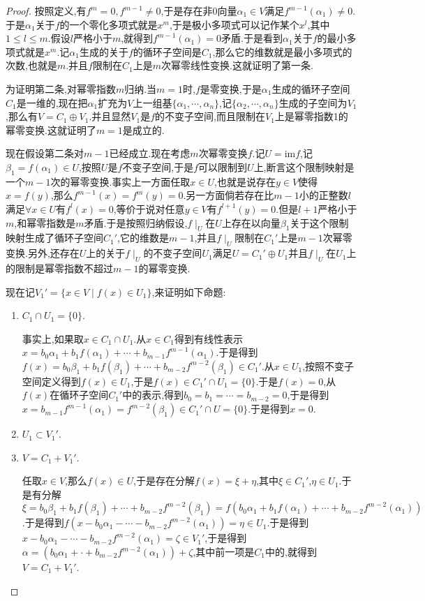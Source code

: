 \begin{proof}
	
	按照定义,有$f^m=0,f^{m-1}\not=0$,于是存在非0向量$\alpha_1\in V$满足$f^{m-1}(\alpha_1)\not=0$.于是$\alpha_1$关于$f$的一个零化多项式就是$x^m$,于是极小多项式可以记作某个$x^l$,其中$1\le l\le m$.假设$l$严格小于$m$,就得到$f^{m-1}(\alpha_1)=0$矛盾.于是看到$\alpha_1$关于$f$的最小多项式就是$x^m$.记$\alpha_1$生成的关于$f$的循环子空间是$C_1$,那么它的维数就是最小多项式的次数,也就是$m$.并且$f$限制在$C_1$上是$m$次幂零线性变换.这就证明了第一条.
	
	为证明第二条,对幂零指数$m$归纳.当$m=1$时,$f$是零变换,于是$\alpha_1$生成的循环子空间$C_1$是一维的,现在把$\alpha_1$扩充为$V$上一组基$\{\alpha_1,\cdots,\alpha_n\}$,记$\{\alpha_2,\cdots,\alpha_n\}$生成的子空间为$V_1$,那么有$V=C_1\oplus V_1$.并且显然$V_1$是$f$的不变子空间,而且限制在$V_1$上是幂零指数1的幂零变换.这就证明了$m=1$是成立的.
	
	现在假设第二条对$m-1$已经成立.现在考虑$m$次幂零变换$f$.记$U=\mathrm{im}f$,记$\beta_1=f(\alpha_1)\in U$,按照$U$是$f$不变子空间,于是$f$可以限制到$U$上,断言这个限制映射是一个$m-1$次的幂零变换.事实上一方面任取$x\in U$,也就是说存在$y\in V$使得$x=f(y)$,那么$f^{m-1}(x)=f^m(y)=0$.另一方面倘若存在比$m-1$小的正整数$l$满足$\forall x\in U$有$f^l(x)=0$,等价于说对任意$y\in V$有$f^{l+1}(y)=0$.但是$l+1$严格小于$m$,和幂零指数是$m$矛盾.于是按照归纳假设,$f\mid_U$在$U$上存在以向量$\beta_1$关于这个限制映射生成了循环子空间$C_1'$,它的维数是$m-1$,并且$f\mid_U$限制在$C_1'$上是$m-1$次幂零变换.另外,还存在$U$上的关于$f\mid_U$的不变子空间$U_1$满足$U=C_1'\oplus U_1$并且$f\mid_U$在$U_1$上的限制是幂零指数不超过$m-1$的幂零变换.
	
	现在记$V_1'=\{x\in V\mid f(x)\in U_1\}$,来证明如下命题:
	\begin{enumerate}
		\item $C_1\cap U_1=\{0\}$.
		
		事实上,如果取$x\in C_1\cap U_1$.从$x\in C_1$得到有线性表示$x=b_0\alpha_1+b_1f(\alpha_1)+\cdots+b_{m-1}f^{m-1}(\alpha_1)$.于是得到$f(x)=b_0\beta_1+b_1f(\beta_1)+\cdots+b_{m-2}f^{m-2}(\beta_1)\in C_1'$.从$x\in U_1$,按照不变子空间定义得到$f(x)\in U_1$,于是$f(x)\in C_1'\cap U_1=\{0\}$.于是$f(x)=0$,从$f(x)$在循环子空间$C_1'$中的表示,得到$b_0=b_1=\cdots=b_{m-2}=0$,于是得到$x=b_{m-1}f^{m-1}(\alpha_1)=f^{m-2}(\beta_1)\in C_1'\cap U=\{0\}$.于是得到$x=0$.
		
		\item $U_1\subset V_1'$.
		\item $V=C_1+V_1'$.
		
		任取$x\in V$,那么$f(x)\in U$,于是存在分解$f(x)=\xi+\eta$,其中$\xi\in C_1'$,$\eta\in U_1$.于是有分解$\xi=b_0\beta_1+b_1f(\beta_1)+\cdots+b_{m-2}f^{m-2}(\beta_1)=f(b_0\alpha_1+b_1f(\alpha_1)+\cdots+b_{m-2}f^{m-2}(\alpha_1))$.于是得到$f(x-b_0\alpha_1-\cdots-b_{m-2}f^{m-2}(\alpha_1))=\eta\in U_1$.于是得到$x-b_0\alpha_1-\cdots-b_{m-2}f^{m-2}(\alpha_1)=\zeta\in V_1'$,于是得到$\alpha=(b_0\alpha_1+\cdot+b_{m-2}f^{m-2}(\alpha_1))+\zeta$,其中前一项是$C_1$中的,就得到$V=C_1+V_1'$.
	\end{enumerate}
	

\end{proof}
